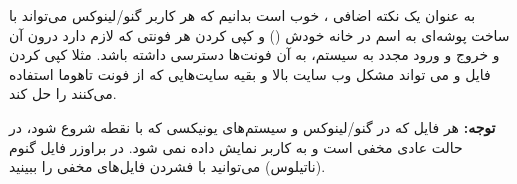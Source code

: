 
به عنوان یک نکته اضافی ، خوب است بدانیم که هر کاربر گنو/لینوکس می‌تواند با ساخت پوشه‌ای به اسم 
 در خانه خودش () و کپی کردن هر فونتی که لازم دارد درون آن و خروج و ورود مجدد به سیستم، به آن فونت‌ها دسترسی داشته باشد. مثلا کپی کردن فایل 
 و 
 می تواند مشکل وب سایت بالا و بقیه سایت‌هایی که از فونت تاهوما استفاده می‌کنند را حل کند.
 
\textbf{توجه: }
هر فایل که در گنو/لینوکس و سیستم‌های یونیکسی که با نقطه شروع شود،‌ در حالت عادی مخفی است و به کاربر نمایش داده نمی شود. در براوزر فایل گنوم (ناتیلوس) می‌توانید با فشردن 
 فایل‌های مخفی را ببینید.
